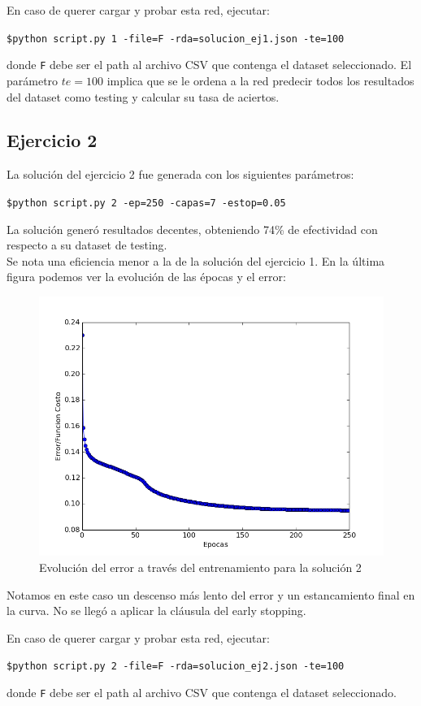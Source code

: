 En caso de querer cargar y probar esta red, ejecutar:

\texttt{\$python script.py 1 -file=F -rda=solucion\_ej1.json -te=100 }

donde \texttt{F} debe ser el path al archivo CSV que contenga el dataset seleccionado. El parámetro $te=100$ implica que se le ordena a la red predecir todos los resultados del dataset como testing y calcular su tasa de aciertos.

\subsection{Ejercicio 2}
La solución del ejercicio 2 fue generada con los siguientes parámetros:

\texttt{\$python script.py 2 -ep=250 -capas=7 -estop=0.05}

La solución generó resultados decentes, obteniendo 74\% de efectividad con respecto a su dataset de testing.\\
Se nota una eficiencia menor a la de la solución del ejercicio 1.
En la última figura podemos ver la evolución de las épocas y el error:

\begin{figure}[h]
  \begin{center}
  \includegraphics[scale=0.50]{graficos/solucion_ej2.png}
  \caption{Evolución del error a través del entrenamiento para la solución 2}
  \end{center}
\end{figure}

\newpage

Notamos en este caso un descenso más lento del error y un estancamiento final en la curva. No se llegó a aplicar la cláusula del early stopping.


En caso de querer cargar y probar esta red, ejecutar:

\texttt{\$python script.py 2 -file=F -rda=solucion\_ej2.json -te=100 }

donde \texttt{F} debe ser el path al archivo CSV que contenga el dataset seleccionado.
